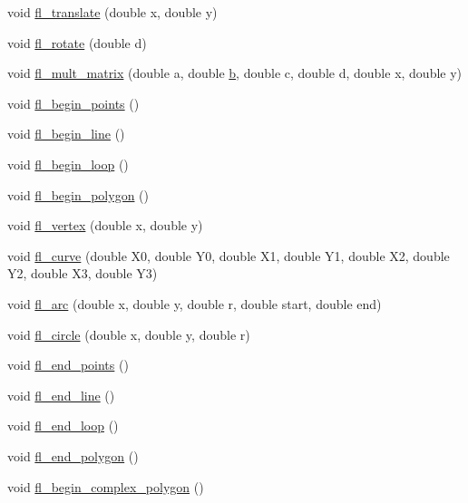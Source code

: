 \begin{DoxyCompactItemize}
void \hyperlink{group__fl__drawings_ga319d6ba89d8a5a0b375dfbef4f265cd0}{fl\+\_\+translate} (double x, double y)
\item 
void \hyperlink{group__fl__drawings_gab2a13525800bed49c0154562d523717f}{fl\+\_\+rotate} (double d)
\item 
void \hyperlink{group__fl__drawings_gab9c6ee4a256e888f7a8af0365f40b515}{fl\+\_\+mult\+\_\+matrix} (double a, double \hyperlink{forms_8_h_a0ba06a290a384fa06b1b90745827dae2}{b}, double c, double d, double x, double y)
\item 
void \hyperlink{group__fl__drawings_ga35cac1d422bd2a1c713e0119407086b1}{fl\+\_\+begin\+\_\+points} ()
\item 
void \hyperlink{group__fl__drawings_gae6a88cd889c957813dc6dc849876b532}{fl\+\_\+begin\+\_\+line} ()
\item 
void \hyperlink{group__fl__drawings_ga3cac8693d88eeec879f909ba03007686}{fl\+\_\+begin\+\_\+loop} ()
\item 
void \hyperlink{group__fl__drawings_ga63b2b306812f12741f271b469e192a8e}{fl\+\_\+begin\+\_\+polygon} ()
\item 
void \hyperlink{group__fl__drawings_ga1201f6cfa1422ac8f508bfaccbe497b3}{fl\+\_\+vertex} (double x, double y)
\item 
void \hyperlink{group__fl__drawings_ga4c5bf16603ecea25acdf2d86d43580a5}{fl\+\_\+curve} (double X0, double Y0, double X1, double Y1, double X2, double Y2, double X3, double Y3)
\item 
void \hyperlink{group__fl__drawings_ga55e75228acb8f4c0febbc72fc9ab50dd}{fl\+\_\+arc} (double x, double y, double r, double start, double end)
\item 
void \hyperlink{group__fl__drawings_gac4540eaf7b5f23944cf332fc8f81f57e}{fl\+\_\+circle} (double x, double y, double r)
\item 
void \hyperlink{group__fl__drawings_gaf715c7239d76c49737eb514e440490b5}{fl\+\_\+end\+\_\+points} ()
\item 
void \hyperlink{group__fl__drawings_ga9f4bbb29153922288a9eebe25352571b}{fl\+\_\+end\+\_\+line} ()
\item 
void \hyperlink{group__fl__drawings_ga5b2013850fe739839e437ef942602532}{fl\+\_\+end\+\_\+loop} ()
\item 
void \hyperlink{group__fl__drawings_gad032c5f7637d440ff545285f2dcc2f44}{fl\+\_\+end\+\_\+polygon} ()
\item 
void \hyperlink{group__fl__drawings_ga11c03773e045738994ffa78acc35c51d}{fl\+\_\+begin\+\_\+complex\+\_\+polygon} ()
\item 

\end{DoxyCompactItemize}
